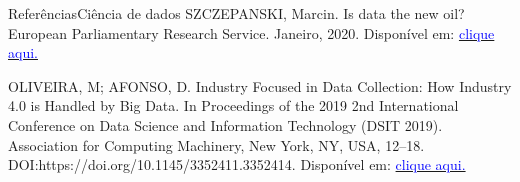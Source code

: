\documentclass[t]{beamer}
\begin{document}

\begin{ftst}{Referências}{Ciência de dados}
\vone
\small
SZCZEPANSKI, Marcin. Is data the new oil? European Parliamentary Research Service. Janeiro, 2020. Disponível em: \href{https://www.europarl.europa.eu/RegData/etudes/BRIE/2020/646117/EPRS_BRI(2020)646117_EN.pdf.}{\textcolor{blue}{clique aqui.}}

\vone

OLIVEIRA, M; AFONSO, D. Industry Focused in Data Collection: How Industry 4.0 is Handled by Big Data. In Proceedings of the 2019 2nd International Conference on Data Science and Information Technology (DSIT 2019). Association for Computing Machinery, New York, NY, USA, 12–18. DOI:https://doi.org/10.1145/3352411.3352414. Disponível em: \href{https://dl.acm.org/doi/10.1145/3352411.3352414}{\textcolor{blue}{clique aqui.}}

\end{ftst}
\end{document}
